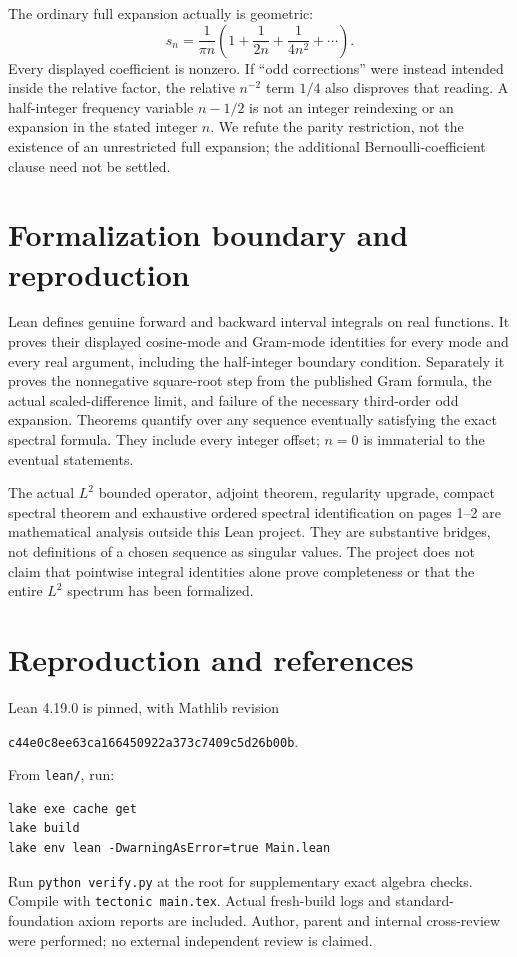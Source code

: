 \documentclass[11pt]{article}
\begin{document}
The ordinary full expansion actually is geometric:
\[
 s_n=\frac1{\pi n}\left(1+\frac1{2n}+\frac1{4n^2}+\cdots\right).
\]
Every displayed coefficient is nonzero. If ``odd corrections''
were instead intended inside the relative factor, the relative
$n^{-2}$ term $1/4$ also disproves that reading. A half-integer
frequency variable $n-1/2$ is not an integer reindexing or an
expansion in the stated integer $n$. We refute the parity
restriction, not the existence of an unrestricted full expansion;
the additional Bernoulli-coefficient clause need not be settled.

\section*{Formalization boundary and reproduction}
Lean defines genuine forward and backward interval integrals on
real functions. It proves their displayed cosine-mode and Gram-mode
identities for every mode and every real argument, including the
half-integer boundary condition. Separately it proves the
nonnegative square-root step from the published Gram formula,
the actual scaled-difference limit, and failure of the necessary
third-order odd expansion. Theorems quantify over any sequence
eventually satisfying the exact spectral formula. They include
every integer offset; $n=0$ is immaterial to the eventual statements.

The actual $L^2$ bounded operator, adjoint theorem, regularity
upgrade, compact spectral theorem and exhaustive ordered spectral
identification on pages 1--2 are mathematical analysis outside
this Lean project. They are substantive bridges, not definitions
of a chosen sequence as singular values. The project does not
claim that pointwise integral identities alone prove completeness
or that the entire $L^2$ spectrum has been formalized.

\newpage
\section*{Reproduction and references}
Lean 4.19.0 is pinned, with Mathlib revision
\begin{center}
\texttt{c44e0c8ee63ca166450922a373c7409c5d26b00b}.
\end{center}
From \texttt{lean/}, run:
\begin{verbatim}
lake exe cache get
lake build
lake env lean -DwarningAsError=true Main.lean
\end{verbatim}
Run \texttt{python verify.py} at the root for supplementary exact
algebra checks. Compile with \texttt{tectonic main.tex}.
Actual fresh-build logs and standard-foundation axiom reports
are included. Author, parent and internal cross-review were
performed; no external independent review is claimed.
\end{document}
